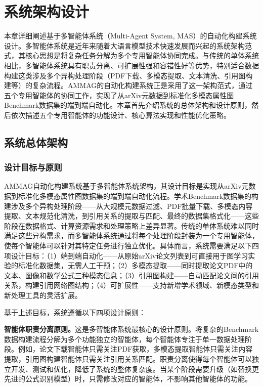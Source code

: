 
\chapter{系统架构设计}

本章详细阐述基于多智能体系统（Multi-Agent System, MAS）\cite{guo2024llm_agent_survey, wu2023autogen}的自动化构建系统设计。多智能体系统是近年来随着大语言模型技术快速发展而兴起的系统架构范式，其核心思想是将复杂任务分解为多个专用智能体协同完成。与传统的单体系统相比，多智能体系统具有职责分离、可扩展性强和容错性好等优势，特别适合数据构建这类涉及多个异构处理阶段（PDF下载、多模态提取、文本清洗、引用图构建等）的复杂流程。AMMAG的自动化构建系统正是采用了这一架构范式，通过五个专用智能体的协同工作，实现了从arXiv元数据到标准化多模态属性图Benchmark数据集的端到端自动化。本章首先介绍系统的总体架构和设计原则，然后依次描述五个专用智能体的功能设计、核心算法实现和性能优化策略。

\section{系统总体架构}

\subsection{设计目标与原则}

AMMAG自动化构建系统基于多智能体系统架构，其设计目标是实现从arXiv元数据到标准化多模态属性图数据集的端到端自动化流程。学术Benchmark数据集的构建涉及多个异构处理阶段——从大规模元数据过滤、PDF批量下载、多模态内容提取、文本规范化清洗，到引用关系的提取与匹配、最终的数据集格式化——这些阶段在数据格式、计算资源需求和处理策略上差异显著。传统的单体系统难以同时满足这些异构需求，而多智能体系统通过将每个处理阶段封装为一个专用智能体，使每个智能体可以针对其特定任务进行独立优化。具体而言，系统需要满足以下四项设计目标：（1）端到端自动化——从原始arXiv论文列表到可直接用于图学习实验的标准化数据集，无需人工干预；（2）多模态提取——同时提取论文PDF中的文本、图像和数学公式三种模态信息；（3）引用图构建——自动匹配论文间的引用关系，构建引用网络图结构；（4）可扩展性——支持新增学术领域、新模态类型和新处理工具的灵活扩展。

基于上述目标，系统遵循以下四项设计原则：

\textbf{智能体职责分离原则。}这是多智能体系统最核心的设计原则。将复杂的Benchmark数据构建流程分解为多个功能独立的智能体，每个智能体专注于单一数据处理阶段。例如，论文下载智能体只需关注PDF获取，多模态提取智能体只需关注内容提取，引用图构建智能体只需关注引用关系匹配。职责分离使得每个智能体可以独立开发、测试和优化，降低了系统的整体复杂度。当某个阶段需要升级（如替换更先进的公式识别模型）时，只需修改对应的智能体，不影响其他智能体的功能。

